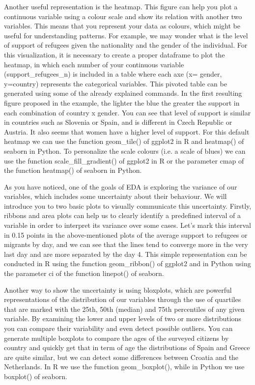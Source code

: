 Another useful representation is the heatmap. This figure can help you plot a continuous variable using a colour scale and show its relation with another two variables.  This means that you represent your data as colours, which might be useful for understanding patterns. For example, we may wonder what is the level of support of refugees given the nationality and the gender of the individual. For this visualization, it is necessary to create a proper dataframe to plot the heatmap, in which each number of your continuous variable (support\_refugees\_n) is included in a table where each axe (x= gender, y=country) represents the categorical variables. This pivoted table can be generated using some of the already explained commands.  In the first resulting figure proposed in the example, the lighter the blue the greater the support in each combination of country x gender. You can see that level of support is similar in countries such as Slovenia or Spain, and is different in Czech Republic or Austria. It also seems that women have a higher level of support. For this default heatmap we can use the function geom\_tile() of ggplot2 in R and heatmap() of seaborn in Python.  To personalize the scale colours (i.e. a scale of blues) we can use the function scale\_fill\_gradient() of ggplot2 in R or the parameter cmap of the function heatmap() of seaborn in Python. 


As you have noticed, one of the goals of EDA is exploring the variance of our variables, which includes some uncertainty about their behaviour. We will introduce you to two basic plots to visually communicate this uncertainty. Firstly, ribbons and area plots can help us to clearly identify a predefined interval of a variable in order to interpret its variance over some cases. Let’s mark this interval in 0.15 points in the above-mentioned plots of the average support to refugees or migrants by day, and we can see that the lines tend to converge more in the very last day and are more separated by the day 4. This simple representation can be conducted in R using the function 	geom\_ribbon() of ggplot2 and in Python using the parameter ci of the function linepot() of seaborn.  


Another way to show the uncertainty is using bloxplots, which are powerful representations of the distribution of our variables through the use of quartiles that are marked with the 25th, 50th (median) and 75th percentiles of any given variable. By examining the lower and upper levels of two or more distributions you can compare their variability and even detect possible outliers. You can generate multiple boxplots to compare the ages of the surveyed citizens by country and quickly get that in term of age the distributions of Spain and Greece are quite similar, but we can detect some differences between Croatia and the Netherlands. In R we use the function geom\_boxplot(), while in Python we use boxplot() of seaborn.

